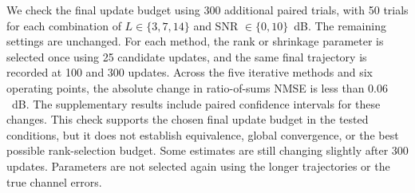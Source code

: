 
We check the final update budget using 300 additional paired trials,
with 50 trials for each combination of $L\in\{3,7,14\}$ and
SNR $\in\{0,10\}$~dB. The remaining settings are unchanged. For each
method, the rank or shrinkage parameter is selected once using 25
candidate updates, and the same final trajectory is recorded at 100 and
300 updates. Across the five iterative methods and six operating points,
the absolute change in ratio-of-sums NMSE is less than $0.06$~dB.
The supplementary results include paired confidence intervals for these
changes. This check supports the chosen final update budget in the tested
conditions, but it does not establish equivalence, global convergence, or
the best possible rank-selection budget. Some estimates are still changing
slightly after 300 updates. Parameters are not selected again using the
longer trajectories or the true channel errors.
